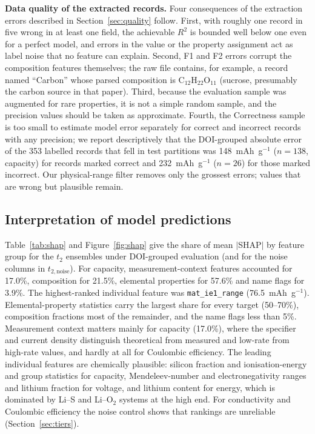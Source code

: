 \documentclass[journal=jcisd8,manuscript=article,layout=traditional]{achemso}
\begin{document}
\textbf{Data quality of the extracted records.} Four consequences of the extraction errors described in Section~\ref{sec:quality} follow. First, with roughly one record in five wrong in at least one field, the achievable $R^2$ is bounded well below one even for a perfect model, and errors in the value or the property assignment act as label noise that no feature can explain. Second, F1 and F2 errors corrupt the composition features themselves; the raw file contains, for example, a record named ``Carbon'' whose parsed composition is C$_{12}$H$_{22}$O$_{11}$ (sucrose, presumably the carbon source in that paper). Third, because the evaluation sample was augmented for rare properties, it is not a simple random sample, and the precision values should be taken as approximate. Fourth, the Correctness sample is too small to estimate model error separately for correct and incorrect records with any precision; we report descriptively that the DOI-grouped absolute error of the 353 labelled records that fell in test partitions was 148~mAh~g$^{-1}$ ($n=138$, capacity) for records marked correct and 232~mAh~g$^{-1}$ ($n=26$) for those marked incorrect. Our physical-range filter removes only the grossest errors; values that are wrong but plausible remain.

\subsection{Interpretation of model predictions}
\label{sec:shap}

Table~\ref{tab:shap} and Figure~\ref{fig:shap} give the share of mean $|$SHAP$|$ by feature group for the $t_2$ ensembles under DOI-grouped evaluation (and for the noise columns in $t_{2,\mathrm{noise}}$). For capacity, measurement-context features accounted for 17.0\%, composition for 21.5\%, elemental properties for 57.6\% and name flags for 3.9\%. The highest-ranked individual feature was \texttt{mat\_ie1\_range} (76.5~mAh~g$^{-1}$). Elemental-property statistics carry the largest share for every target (50--70\%), composition fractions most of the remainder, and the name flags less than 5\%. Measurement context matters mainly for capacity (17.0\%), where the specifier and current density distinguish theoretical from measured and low-rate from high-rate values, and hardly at all for Coulombic efficiency. The leading individual features are chemically plausible: silicon fraction and ionisation-energy and group statistics for capacity, Mendeleev-number and electronegativity ranges and lithium fraction for voltage, and lithium content for energy, which is dominated by Li--S and Li--O$_2$ systems at the high end. For conductivity and Coulombic efficiency the noise control shows that rankings are unreliable (Section~\ref{sec:tiers}).
\end{document}
